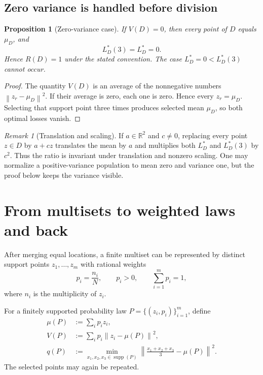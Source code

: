 \documentclass[11pt]{article}
\newtheorem{proposition}[theorem]{Proposition}
\theoremstyle{definition}
\theoremstyle{remark}
\newtheorem{remark}[theorem]{Remark}
\newcommand{\R}{\mathbb{R}}
\newcommand{\supp}{\operatorname{supp}}
\newcommand{\norm}[1]{\left\lVert #1\right\rVert}
\begin{document}
\subsection{Zero variance is handled before division}

\begin{proposition}[Zero-variance case]
If $V(D)=0$, then every point of $D$ equals $\mu_D$, and
\[
L_D^*(3)=L_D^*=0.
\]
Hence $R(D)=1$ under the stated convention.  The case $L_D^*=0<L_D^*(3)$ cannot occur.
\end{proposition}

\begin{proof}
The quantity $V(D)$ is an average of the nonnegative numbers $\norm{z_r-\mu_D}^2$.  If their average is zero, each one is zero.  Hence every $z_r=\mu_D$.  Selecting that support point three times produces selected mean $\mu_D$, so both optimal losses vanish.
\end{proof}

\begin{remark}[Translation and scaling]
If $a\in\R^2$ and $c\ne0$, replacing every point $z\in D$ by $a+cz$ translates the mean by $a$ and multiplies both $L_D^*$ and $L_D^*(3)$ by $c^2$.  Thus the ratio is invariant under translation and nonzero scaling.  One may normalize a positive-variance population to mean zero and variance one, but the proof below keeps the variance visible.
\end{remark}

\section{From multisets to weighted laws and back}

After merging equal locations, a finite multiset can be represented by distinct support points $z_1,\ldots,z_m$ with rational weights
\[
p_i=\frac{n_i}{N},\qquad p_i>0,\qquad \sum_{i=1}^m p_i=1,
\]
where $n_i$ is the multiplicity of $z_i$.

For a finitely supported probability law $P=\{(z_i,p_i)\}_{i=1}^m$, define
\begin{align}
\mu(P)&:=\sum_i p_i z_i,\label{eq:weighted-mean}\\
V(P)&:=\sum_i p_i\norm{z_i-\mu(P)}^2,\label{eq:weighted-variance}\\
q(P)&:=\min_{x_1,x_2,x_3\in\supp(P)}
\norm{\frac{x_1+x_2+x_3}{3}-\mu(P)}^2.
\label{eq:weighted-q}
\end{align}
The selected points may again be repeated.
\end{document}
